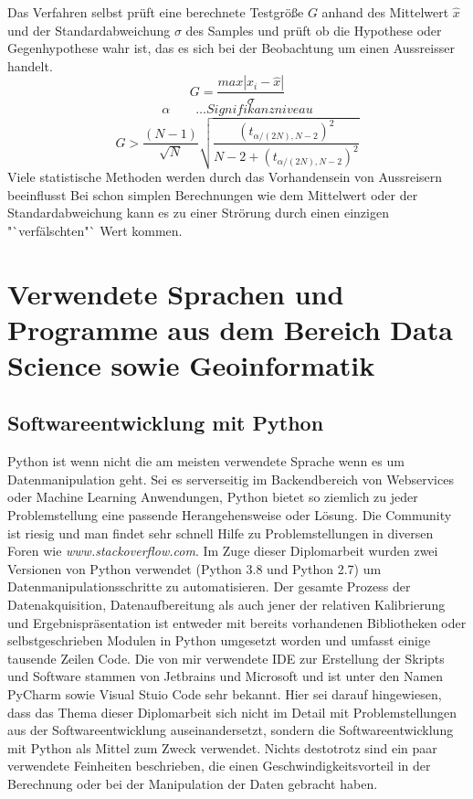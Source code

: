 \documentclass[11pt]{report}
\begin{document}
Das Verfahren selbst prüft eine berechnete Testgröße $G$ anhand des Mittelwert $\hat{x}$ und der Standardabweichung $\sigma$ des Samples und prüft ob die Hypothese oder Gegenhypothese wahr ist, das es sich bei der Beobachtung um einen Aussreisser handelt. \newline
\begin{equation}
G=\frac{max\left|x_i - \hat{x}\right|}{\sigma}
\end{equation}\newline
\begin{equation}
\alpha \qquad \dots Signifikanzniveau
\end{equation}\newline
\begin{equation}
G> \frac{(N-1)}{\sqrt{N}}\sqrt{\frac{(t_{\alpha / (2N),N-2})^2}{N-2+(t_{\alpha / (2N),N-2})^2}}
\end{equation}\newline
Viele statistische Methoden werden durch das Vorhandensein von Aussreisern beeinflusst  Bei schon simplen Berechnungen wie dem Mittelwert oder der Standardabweichung kann es zu einer Strörung durch einen einzigen "`verfälschten"` Wert kommen.

\section{Verwendete Sprachen und Programme aus dem Bereich Data Science sowie Geoinformatik}
\subsection{Softwareentwicklung mit Python}

Python ist wenn nicht die am meisten verwendete Sprache wenn es um Datenmanipulation geht. Sei es serverseitig im Backendbereich von Webservices oder Machine Learning Anwendungen, Python bietet so ziemlich zu jeder Problemstellung eine passende Herangehensweise oder Lösung. Die Community ist riesig und man findet sehr schnell Hilfe zu Problemstellungen in diversen Foren wie \emph{www.stackoverflow.com}. Im Zuge dieser Diplomarbeit wurden zwei Versionen von Python verwendet (Python 3.8 und Python 2.7) um Datenmanipulationsschritte zu automatisieren. Der gesamte Prozess der Datenakquisition, Datenaufbereitung als auch jener der relativen Kalibrierung und Ergebnispräsentation ist entweder mit bereits vorhandenen Bibliotheken oder selbstgeschrieben Modulen in Python umgesetzt worden und umfasst einige tausende Zeilen Code. Die von mir verwendete IDE zur Erstellung der Skripts und Software stammen von Jetbrains und Microsoft und ist unter den Namen PyCharm sowie Visual Stuio Code sehr bekannt. Hier sei darauf hingewiesen, dass das Thema dieser Diplomarbeit sich nicht im Detail mit Problemstellungen aus der Softwareentwicklung auseinandersetzt, sondern die Softwareentwicklung mit Python als Mittel zum Zweck verwendet. Nichts destotrotz sind ein paar verwendete Feinheiten beschrieben, die einen Geschwindigkeitsvorteil in der Berechnung oder bei der Manipulation der Daten gebracht haben. 
\end{document}
